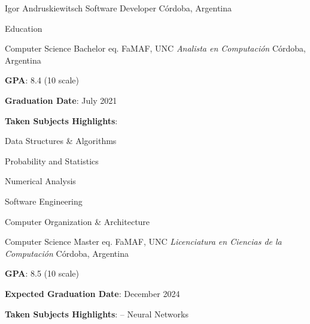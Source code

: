 \documentclass{curriculum}
\begin{document}

\begin{cvheader}

\makeheader
    {Igor Andruskiewitsch}  {}
    {Software Developer}    {}
    {Córdoba, Argentina}    {}

\end{cvheader}


\begin{cvsection}{Education}

    \makesectionitemheader
        {Computer Science Bachelor eq.}  {FaMAF, UNC}
        {\it{Analista en Computación}}   {Córdoba, Argentina}
        \begin{sectionitemlist}
        \item { \textbf{GPA}: 8.4 (10 scale) }
        \item { \textbf{Graduation Date}: July 2021 }
        \item { \textbf{Taken Subjects Highlights}: }
            \begin{colsectionitemlist}{3}
                \item{Data Structures \& Algorithms}
                \item{Probability and Statistics}
                \item{Numerical Analysis}
                \item{Software Engineering}
                \item{Computer Organization \& Architecture}
            \end{colsectionitemlist}
        \end{sectionitemlist}

    \makesectionitemheader
        {Computer Science Master eq.}                      {FaMAF, UNC}
        {\it{Licenciatura en Ciencias de la Computación}}  {Córdoba, Argentina}
        \begin{sectionitemlist}
        \item { \textbf{GPA}: 8.5 (10 scale) }
        \item { \textbf{Expected Graduation Date}: December 2024 }
        \item { \textbf{Taken Subjects Highlights}: – Neural Networks}
        \end{sectionitemlist}

\end{cvsection}
\end{document}
